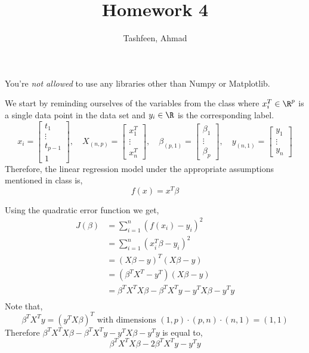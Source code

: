 \documentclass{homework}
\author{Tashfeen, Ahmad}
\title{Homework 4}
\begin{document}
 \maketitle

You're \textit{not allowed} to use any libraries other than Numpy or
Matplotlib.

We start by reminding ourselves of the variables from the class where
$x_i^T \in \R^p$ is a single data point in the data set and
$y_i\in \R$ is the corresponding label.
\[
  x_i =
  \begin{bmatrix}
    t_1 \\ \vdots \\ t_{p-1} \\ 1
  \end{bmatrix},
  \quad
  X_{(n, p)} =
  \begin{bmatrix}
    x^T_1 \\ \vdots \\ x^T_n
  \end{bmatrix},
  \quad
  \beta_{(p, 1)} =
  \begin{bmatrix}
    \beta_1 \\ \vdots \\ \beta_p
  \end{bmatrix},
  \quad
  y_{(n, 1)} =
  \begin{bmatrix}
    y_1 \\ \vdots \\ y_n
  \end{bmatrix}
\]
Therefore, the linear regression model under the appropriate
assumptions mentioned in class is,
\[
  f(x) = x^T\beta
\]

Using the quadratic error function we get,
\begin{align*}
  J(\beta) & = \sum_{i=1}^n(f(x_i) - y_{i})^2                    \\
           & = \sum_{i=1}^n(x_i^T\beta - y_{i})^2                \\
           & = (X\beta - y)^T(X\beta - y)                        \\
           & = (\beta^TX^T - y^T)(X\beta - y)                    \\
           & = \beta^TX^TX\beta - \beta^TX^Ty - y^TX\beta - y^Ty \\
\end{align*}
Note that,
\[
  \beta^TX^Ty = (y^TX\beta)^T
  \text{ with dimensions }
  (1, p) \cdot (p, n) \cdot (n, 1) = (1, 1)
\]
Therefore $ \beta^TX^TX\beta - \beta^TX^Ty - y^TX\beta - y^Ty$ is
equal to,
\[
  \beta^TX^TX\beta - 2\beta^TX^Ty - y^Ty
\]
\end{document}
